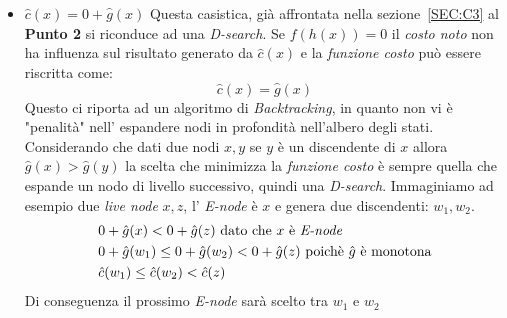 \documentclass[a4paper]{article}
\begin{document}
\begin{itemize}
	\item $\hat c(x) = 0 + \hat g(x)$ Questa casistica, già affrontata nella sezione~\ref{SEC:C3} al \textbf{Punto 2} si riconduce ad una \textit{D-search}.
		Se $f(h(x)) =0$ il \textit{costo noto} non ha influenza sul risultato generato da $\hat c(x)$ e la \textit{funzione costo} può essere riscritta come: $$\hat c(x) = \hat g(x)$$
Questo ci riporta ad un algoritmo di \textit{Backtracking}, in quanto non vi è "penalità" nell' espandere nodi in profondità nell'albero degli stati.
Considerando che dati due nodi $x,y$ se $y$ è un discendente di $x$ allora $\hat g(x) > \hat g(y)$ la scelta che minimizza la \textit{funzione costo} è sempre quella che espande un nodo di livello successivo, quindi una \textit{D-search}.
Immaginiamo ad esempio due \textit{live node} $x,z$, l' \textit{E-node} è $x$ e genera due discendenti: $w_1, w_2$.
                \begin{align}
                        &0 + \hat g(x) < 0 + \hat g(z) \text{ dato che $x$ è \textit{E-node}} \notag \\
                        &0 + \hat g(w_1) \leq 0 + \hat g(w_2) < 0 + \hat g(z) \text{ poichè $\hat g$ è monotona} \notag\\
                        &\hat c(w_1) \leq \hat c(w_2) < \hat c(z) \notag
                \end{align}
Di conseguenza il prossimo \textit{E-node} sarà scelto tra $w_1$ e $w_2$

\end{itemize}
\end{document}
